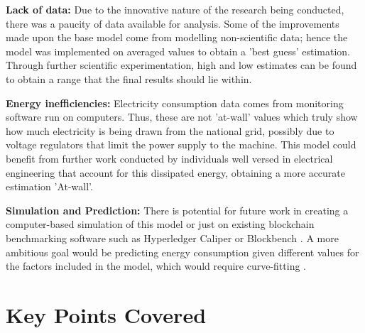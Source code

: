 \textbf{Lack of data:} Due to the innovative nature of the research being conducted, there was a paucity of data available for analysis. Some of the improvements made upon the base model come from modelling non-scientific data; hence the model was implemented on averaged values to obtain a 'best guess' estimation. Through further scientific experimentation, high and low estimates can be found to obtain a range that the final results should lie within. 

\textbf{Energy inefficiencies: } Electricity consumption data comes from monitoring software run on computers. Thus, these are not 'at-wall' values which truly show how much electricity is being drawn from the national grid, possibly due to voltage regulators that limit the power supply to the machine. This model could benefit from further work conducted by individuals well versed in electrical engineering that account for this dissipated energy, obtaining a more accurate estimation 'At-wall'.

\textbf{Simulation and Prediction: } There is potential for future work in creating a computer-based simulation of this model or just on existing blockchain benchmarking software such as Hyperledger Caliper or Blockbench \cite{Aldweesh2020BenchmarkingApplications}. A more ambitious goal would be predicting energy consumption given different values for the factors included in the model, which would require curve-fitting \cite{IbanezTheExpansion}.


\section{Key Points Covered}
